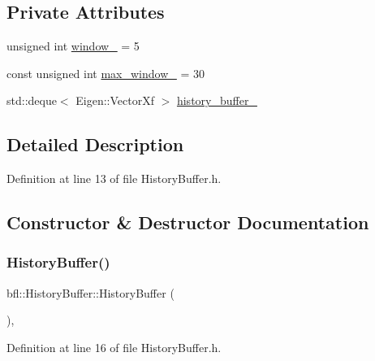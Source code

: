 \subsection*{Private Attributes}
\begin{DoxyCompactItemize}
\item 
unsigned int \mbox{\hyperlink{classbfl_1_1HistoryBuffer_a135dd1829747ba2f414f12fd8282f75a}{window\+\_\+}} = 5
\item 
const unsigned int \mbox{\hyperlink{classbfl_1_1HistoryBuffer_aeb4d2b9c58f06177b0daaf640e2b6c9e}{max\+\_\+window\+\_\+}} = 30
\item 
std\+::deque$<$ Eigen\+::\+Vector\+Xf $>$ \mbox{\hyperlink{classbfl_1_1HistoryBuffer_a7f3992afff5140e0d3899b03bb26b9ac}{history\+\_\+buffer\+\_\+}}
\end{DoxyCompactItemize}


\subsection{Detailed Description}


Definition at line 13 of file History\+Buffer.\+h.



\subsection{Constructor \& Destructor Documentation}
\mbox{\label{classbfl_1_1HistoryBuffer_a0b0c850ed4a50eeb7eb3d88e10937c1b}} 
\subsubsection{\texorpdfstring{History\+Buffer()}{HistoryBuffer()}\hspace{0.1cm}{\footnotesize\ttfamily [1/2]}}
{\footnotesize\ttfamily bfl\+::\+History\+Buffer\+::\+History\+Buffer (\begin{DoxyParamCaption}{ }\end{DoxyParamCaption})\hspace{0.3cm}{\ttfamily [inline]}, {\ttfamily [noexcept]}}



Definition at line 16 of file History\+Buffer.\+h.

